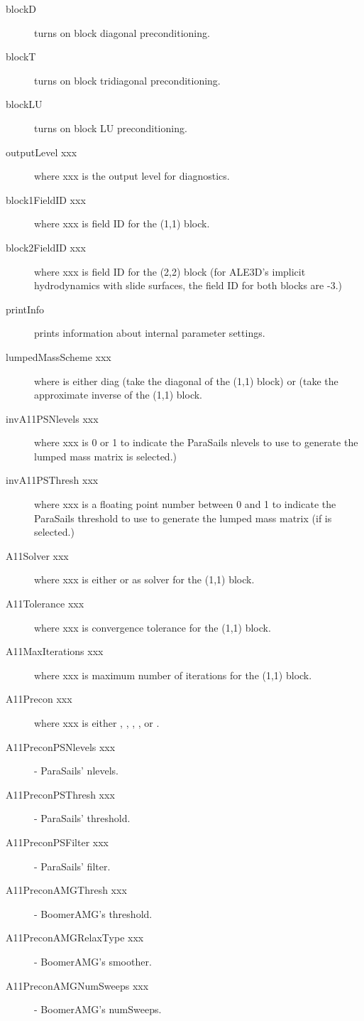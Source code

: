 \begin{description}
\item[blockD] turns on block diagonal preconditioning.
\item[blockT] turns on block tridiagonal preconditioning.
\item[blockLU] turns on block LU preconditioning.
\item[outputLevel xxx] where xxx is the output level for diagnostics.
\item[block1FieldID xxx] where xxx is field ID for the (1,1) block.
\item[block2FieldID xxx] where xxx is field ID for the (2,2) block (for
    ALE3D's implicit hydrodynamics with slide surfaces, the field ID for
    both blocks are -3.)
\item[printInfo] prints information about internal parameter settings.
\item[lumpedMassScheme xxx] where is either {\sf diag} (take the diagonal
     of the (1,1) block) or  (take the approximate inverse of
     the (1,1) block.
\item[invA11PSNlevels xxx] where xxx is 0 or 1 to indicate the ParaSails
     nlevels to use to generate the lumped mass matrix  is
     selected.)
\item[invA11PSThresh xxx] where xxx is a floating point number between 0
     and 1 to indicate the ParaSails threshold to use to generate the lumped
     mass matrix (if  is selected.)
\item[A11Solver xxx] where xxx is either  or  as solver
     for the (1,1) block.
\item[A11Tolerance xxx] where xxx is convergence tolerance for the
     (1,1) block.
\item[A11MaxIterations xxx] where xxx is maximum number of iterations for
     the (1,1) block.
\item[A11Precon xxx] where xxx is either , , 
     , , or .
\item[A11PreconPSNlevels xxx] - ParaSails' nlevels.
\item[A11PreconPSThresh xxx] - ParaSails' threshold.
\item[A11PreconPSFilter xxx] - ParaSails' filter.
\item[A11PreconAMGThresh xxx] - BoomerAMG's threshold.
\item[A11PreconAMGRelaxType xxx] - BoomerAMG's smoother.
\item[A11PreconAMGNumSweeps xxx] - BoomerAMG's numSweeps.

\end{description}
